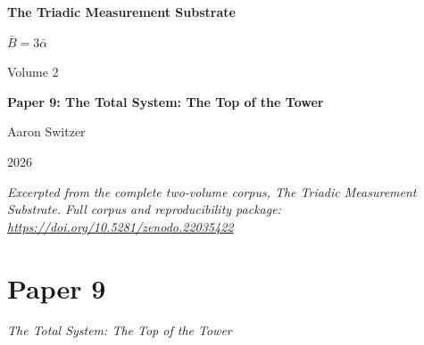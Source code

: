 \documentclass[11pt,oneside]{report}
\theoremstyle{definition}
\theoremstyle{remark}
\begin{document}
\thispagestyle{empty}
\begin{titlepage}
\centering
\vspace*{2cm}
{\sffamily\bfseries\Large The Triadic Measurement Substrate\par}
\vspace{0.6cm}
{\large $\bar{B} = 3\bar{\alpha}$\par}
\vspace{1cm}
{\sffamily\large Volume 2\par}
\vspace{1.4cm}
{\Large \bfseries Paper 9: The Total System: The Top of the Tower\par}
\vfill
{\large Aaron Switzer\par}
\vspace{0.4cm}
{\large 2026\par}
\vspace{1.2cm}
{\small\itshape Excerpted from the complete two-volume corpus, \emph{The Triadic Measurement Substrate}. Full corpus and reproducibility package: \url{https://doi.org/10.5281/zenodo.22035422}\par}
\end{titlepage}
\cleardoublepage
{}


\chapter*{Paper 9}

{\large\itshape The Total System: The Top of the Tower\par}\vspace{0.8em}

\par\vspace{0.6em}
\end{document}
